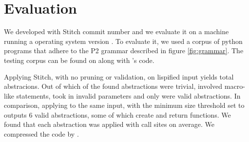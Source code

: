 \section{Evaluation}
\label{sec:eval}


We developed \toolname with Stitch commit number  and we evaluate it on a  machine running a  operating system version . To evaluate it, we used a corpus of  python programs  that adhere to the P2 grammar described in figure \ref{fig:grammar}. The testing corpus can be found on  along with \toolname's code. 

Applying Stitch, with no pruning or validation, on lispified input yields  total abstracions. Out of which  of the  found abstractions were trivial,  involved macro-like statements,  took in invalid parameters and only  were valid abstractions. In comparison, applying \toolname to the same input, with the minimum size threshold set to  outputs 6 valid abstractions, some of which create and return functions. We found that each abstraction was applied with  call sites on average. We compressed the code by .








